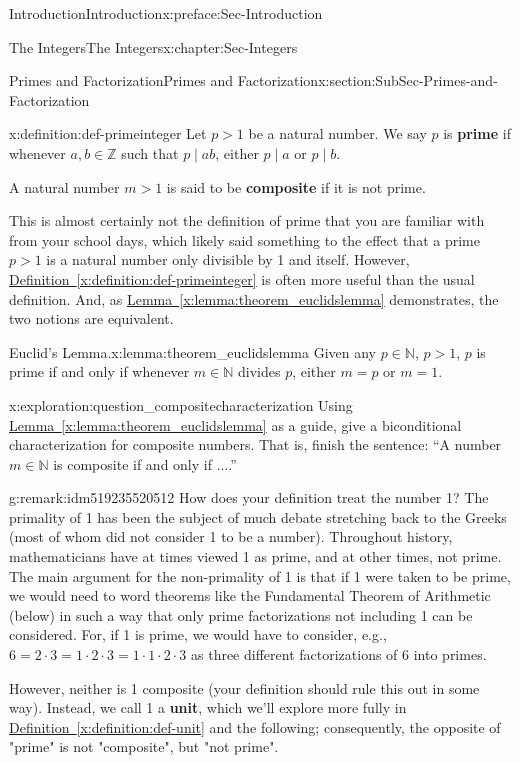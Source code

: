 \documentclass[oneside,10pt,]{book}
\newcommand{\xreffont}{\relax}
\newcommand{\terminology}[1]{\textbf{#1}}
\numberwithin{equation}{section}
\def\Z{{\mathbb Z}}
\def\N{{\mathbb N}}
\begin{document}
\begin{preface}{Introduction}{}{Introduction}{}{}{x:preface:Sec-Introduction}
\begin{chapterptx}{The Integers}{}{The Integers}{}{}{x:chapter:Sec-Integers}
\begin{sectionptx}{Primes and Factorization}{}{Primes and Factorization}{}{}{x:section:SubSec-Primes-and-Factorization}
\begin{definition}{}{x:definition:def-primeinteger}%
%
%
Let \(p > 1\) be a natural number. We say \(p\) is \terminology{prime} if whenever \(a,b\in \Z\) such that \(p\mid ab\), either \(p\mid a\) or \(p\mid b\).%
\par
A natural number \(m > 1\) is said to be \terminology{composite} if it is not prime.%
\end{definition}
This is almost certainly not the definition of prime that you are familiar with from your school days, which likely said something to the effect that a prime \(p > 1\) is a natural number only divisible by 1 and itself. However, \hyperref[x:definition:def-primeinteger]{Definition~{\xreffont\ref{x:definition:def-primeinteger}}} is often more useful than the usual definition. And, as \hyperref[x:lemma:theorem_euclidslemma]{Lemma~{\xreffont\ref{x:lemma:theorem_euclidslemma}}} demonstrates, the two notions are equivalent.%
\begin{lemma}{Euclid's Lemma.}{}{x:lemma:theorem_euclidslemma}%
Given any \(p\in \N\), \(p > 1\), \(p\) is prime if and only if whenever \(m\in \N\) divides \(p\), either \(m = p\) or \(m = 1\).%
\end{lemma}
\begin{exploration}{}{x:exploration:question_compositecharacterization}%
Using \hyperref[x:lemma:theorem_euclidslemma]{Lemma~{\xreffont\ref{x:lemma:theorem_euclidslemma}}} as a guide, give a biconditional characterization for composite numbers. That is, finish the sentence: ``A number \(m\in\N\) is composite if and only if ....''%
\end{exploration}
\begin{remark}{}{g:remark:idm519235520512}%
How does your definition treat the number 1? The primality of 1 has been the subject of much debate stretching back to the Greeks (most of whom did not consider 1 to be a number). Throughout history, mathematicians have at times viewed 1 as prime, and at other times, not prime. The main argument for the non-primality of 1 is that if 1 were taken to be prime, we would need to word theorems like the Fundamental Theorem of Arithmetic (below) in such a way that only prime factorizations not including 1 can be considered. For, if 1 is prime, we would have to consider, e.g., \(6 = 2\cdot 3 = 1\cdot 2 \cdot 3 = 1\cdot 1\cdot 2\cdot 3\) as three different factorizations of 6 into primes.%
\par
However, neither is 1 composite (your definition should rule this out in some way). Instead, we call 1 a \terminology{unit}, which we'll explore more fully in \hyperref[x:definition:def-unit]{Definition~{\xreffont\ref{x:definition:def-unit}}} and the following; consequently, the opposite of "prime" is not "composite", but "not prime".%

\end{remark}
\end{sectionptx}
\end{chapterptx}
\end{preface}
\end{document}
